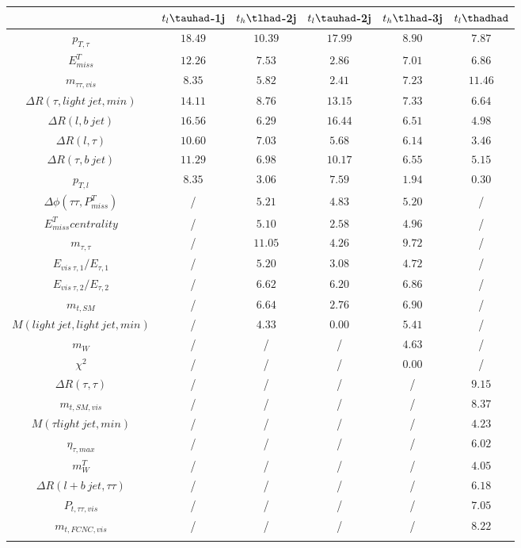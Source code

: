 \centering
\begin{tabular}{cccccc} \toprule\toprule
 & $t_{l}\tauhad$-1j & $t_{h}\tlhad$-2j & $t_{l}\tauhad$-2j & $t_{h}\tlhad$-3j & $t_l\thadhad$\\\midrule
$p_{T,\tau }$ & $18.49$ & $10.39$ & $17.99$ & $8.90$ & $7.87$\\
$E^{T}_{miss}$ & $12.26$ & $7.53$ & $2.86$ & $7.01$ & $6.86$\\
$m_{\tau \tau ,vis}$ & $8.35$ & $5.82$ & $2.41$ & $7.23$ & $11.46$\\
$\Delta R(\tau ,light~jet,min)$ & $14.11$ & $8.76$ & $13.15$ & $7.33$ & $6.64$\\
$\Delta R(l,b~jet)$ & $16.56$ & $6.29$ & $16.44$ & $6.51$ & $4.98$\\
$\Delta R(l,\tau )$ & $10.60$ & $7.03$ & $5.68$ & $6.14$ & $3.46$\\
$\Delta R(\tau ,b~jet)$ & $11.29$ & $6.98$ & $10.17$ & $6.55$ & $5.15$\\
$p_{T,l}$ & $8.35$ & $3.06$ & $7.59$ & $1.94$ & $0.30$\\
$\Delta\phi(\tau \tau ,P^{T}_{miss})$ &  / & $5.21$ & $4.83$ & $5.20$ &  /\\
$E^{T}_{miss} centrality$ &  / & $5.10$ & $2.58$ & $4.96$ &  /\\
$m_{\tau ,\tau }$ &  / & $11.05$ & $4.26$ & $9.72$ &  /\\
$E_{vis~\tau ,1}/E_{\tau ,1}$ &  / & $5.20$ & $3.08$ & $4.72$ &  /\\
$E_{vis~\tau ,2}/E_{\tau ,2}$ &  / & $6.62$ & $6.20$ & $6.86$ &  /\\
$m_{t,SM}$ &  / & $6.64$ & $2.76$ & $6.90$ &  /\\
$M(light~jet,light~jet,min)$ &  / & $4.33$ & $0.00$ & $5.41$ &  /\\
$m_{W}$ &  / &  / &  / & $4.63$ &  /\\
$\chi^{2}$ &  / &  / &  / & $0.00$ &  /\\
$\Delta R(\tau ,\tau )$ &  / &  / &  / &  / & $9.15$\\
$m_{t,SM,vis}$ &  / &  / &  / &  / & $8.37$\\
$M(\tau  light~jet,min)$ &  / &  / &  / &  / & $4.23$\\
$\eta_{\tau ,max}$ &  / &  / &  / &  / & $6.02$\\
$m^{T}_{W}$ &  / &  / &  / &  / & $4.05$\\
$\Delta R(l+b~jet,\tau \tau )$ &  / &  / &  / &  / & $6.18$\\
$P_{t,\tau \tau ,vis}$ &  / &  / &  / &  / & $7.05$\\
$m_{t,FCNC,vis}$ &  / &  / &  / &  / & $8.22$\\
\bottomrule\bottomrule\\
\end{tabular}
